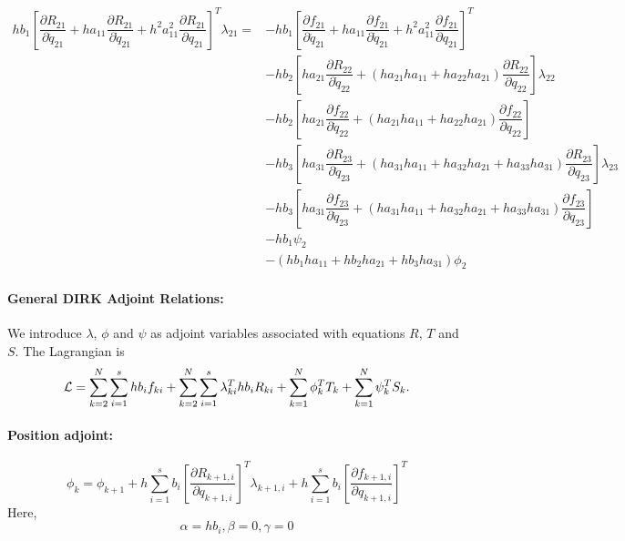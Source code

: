\documentclass[10pt,letter]{book}
\newcommand{\pd}[2]{\dfrac{\partial #1}{\partial #2}}
\begin{document}
     \begin{equation}
       \begin{split}
         hb_1\left[\pd{R_{21}}{\ddot{q}_{21}} + ha_{11}\pd{R_{21}}{\dot{q}_{21}} + h^2a_{11}^2 \pd{R_{21}}{{q}_{21}} \right]^T \lambda_{21} = & - hb_1 \left[\pd{f_{21}}{\ddot{q}_{21}} + ha_{11}\pd{f_{21}}{\dot{q}_{21}} + h^2a_{11}^2 \pd{f_{21}}{{q}_{21}} \right]^T \\ 
         & - hb_2 \left[ ha_{21} \pd{R_{22}}{\dot{q}_{22}} + (ha_{21}ha_{11} + ha_{22}ha_{21}) \pd{R_{22}}{{q}_{22}} \right]\lambda_{22} \\
         & - hb_2 \left[ ha_{21} \pd{f_{22}}{\dot{q}_{22}} + (ha_{21}ha_{11} + ha_{22}ha_{21}) \pd{f_{22}}{{q}_{22}} \right] \\
         & - hb_3 \left[ ha_{31} \pd{R_{23}}{\dot{q}_{23}} + (ha_{31}ha_{11} + ha_{32}ha_{21} + ha_{33}ha_{31}) \pd{R_{23}}{{q}_{23}} \right] \lambda_{23} \\
         & - hb_3 \left[ ha_{31} \pd{f_{23}}{\dot{q}_{23}} + (ha_{31}ha_{11} + ha_{32}ha_{21} + ha_{33}ha_{31}) \pd{f_{23}}{{q}_{23}} \right] \\
         & - hb_1 \psi_2 \\ 
         & - (hb_1ha_{11} + hb_2ha_{21}+ hb_3ha_{31})  \phi_2
       \end{split}
     \end{equation}


     \paragraph{General DIRK Adjoint Relations:}
     We introduce $\lambda$, $\phi$ and $\psi$ as adjoint variables associated with equations $R$, $T$ and $S$. The Lagrangian is
     $$ {\cal{L}} = \sum_{k=2}^{N} \sum_{i=1}^s h b_i f_{ki}  +  \sum_{k=2}^{N} \sum_{i=1}^s\lambda_{ki}^T  h b_i R_{ki}   + \sum_{k=1}^N \phi_k^T T_k + \sum_{k=1}^N \psi_k^T S_k. $$

     
     \paragraph{Position adjoint:}
     

     \begin{equation}\nonumber
       \phi_k = \phi_{k+1} + h \sum_{i=1}^s b_i \left[ \pd{R_{k+1,i}}{q_{k+1,i}} \right]^T \lambda_{k+1,i} + h \sum_{i=1}^s b_i \left[ \pd{f_{k+1,i}}{q_{k+1,i}} \right]^T
     \end{equation}
     Here, $$ \alpha = hb_i, \beta = 0, \gamma = 0$$
     
\end{document}
